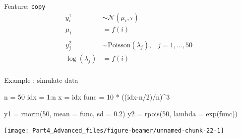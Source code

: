 \documentclass[
  ignorenonframetext,
  handout]{beamer}
\newenvironment{Shaded}{\begin{snugshade}}{\end{snugshade}}
\newcommand{\AttributeTok}[1]{\textcolor[rgb]{0.77,0.63,0.00}{#1}}
\newcommand{\DecValTok}[1]{\textcolor[rgb]{0.00,0.00,0.81}{#1}}
\newcommand{\FloatTok}[1]{\textcolor[rgb]{0.00,0.00,0.81}{#1}}
\newcommand{\FunctionTok}[1]{\textcolor[rgb]{0.00,0.00,0.00}{#1}}
\newcommand{\NormalTok}[1]{#1}
\newcommand{\OtherTok}[1]{\textcolor[rgb]{0.56,0.35,0.01}{#1}}
\newcommand{\SpecialCharTok}[1]{\textcolor[rgb]{0.00,0.00,0.00}{#1}}
\begin{document}
\begin{frame}{Feature: \texttt{copy}}
\protect\hypertarget{feature-copy-4}{}
\[
\begin{aligned}
y^1_i & \sim \mathcal{N}(\mu_i,\tau)\\
\mu_i &= f(i)\\
\\
y^2_j & \sim \text{Poisson}(\lambda_j),& j = 1,\dots,50\\
\log(\lambda_j) &= f(i)\\
\end{aligned}
\]
\end{frame}

\begin{frame}[fragile]{Example : simulate data}
\protect\hypertarget{example-simulate-data-3}{}
\footnotesize

\begin{Shaded}
\begin{Highlighting}[]
\NormalTok{n }\OtherTok{=} \DecValTok{50}
\NormalTok{idx }\OtherTok{=} \DecValTok{1}\SpecialCharTok{:}\NormalTok{n}
\NormalTok{x }\OtherTok{=}\NormalTok{ idx}
\NormalTok{func }\OtherTok{=} \DecValTok{10} \SpecialCharTok{*}\NormalTok{ ((idx}\SpecialCharTok{{-}}\NormalTok{n}\SpecialCharTok{/}\DecValTok{2}\NormalTok{)}\SpecialCharTok{/}\NormalTok{n)}\SpecialCharTok{\^{}}\DecValTok{3}

\NormalTok{y1 }\OtherTok{=} \FunctionTok{rnorm}\NormalTok{(}\DecValTok{50}\NormalTok{, }\AttributeTok{mean =}\NormalTok{ func, }\AttributeTok{sd =} \FloatTok{0.2}\NormalTok{)}
\NormalTok{y2 }\OtherTok{=} \FunctionTok{rpois}\NormalTok{(}\DecValTok{50}\NormalTok{, }\AttributeTok{lambda  =} \FunctionTok{exp}\NormalTok{(func))}
\end{Highlighting}
\end{Shaded}

\begin{center}\texttt{[image: Part4\_Advanced\_files/figure-beamer/unnamed-chunk-22-1]} \end{center}
\normalsize
\end{frame}
\end{document}

